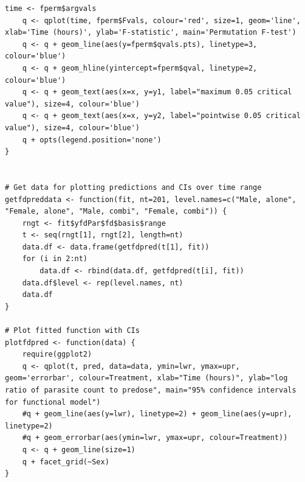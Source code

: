 \begin{singlespace}
\begin{lstlisting}[caption=Functional data analysis plots,label=R:fdaplot]
	time <- fperm$argvals
	q <- qplot(time, fperm$Fvals, colour='red', size=1, geom='line', xlab='Time (hours)', ylab='F-statistic', main='Permutation F-test')
	q <- q + geom_line(aes(y=fperm$qvals.pts), linetype=3, colour='blue')
	q <- q + geom_hline(yintercept=fperm$qval, linetype=2, colour='blue')
	q <- q + geom_text(aes(x=x, y=y1, label="maximum 0.05 critical value"), size=4, colour='blue')
	q <- q + geom_text(aes(x=x, y=y2, label="pointwise 0.05 critical value"), size=4, colour='blue')
	q + opts(legend.position='none')
}


# Get data for plotting predictions and CIs over time range
getfdpreddata <- function(fit, nt=201, level.names=c("Male, alone", "Female, alone", "Male, combi", "Female, combi")) {
	rngt <- fit$yfdPar$fd$basis$range
	t <- seq(rngt[1], rngt[2], length=nt)
	data.df <- data.frame(getfdpred(t[1], fit))
	for (i in 2:nt)
		data.df <- rbind(data.df, getfdpred(t[i], fit))
	data.df$level <- rep(level.names, nt)
	data.df
}

# Plot fitted function with CIs
plotfdpred <- function(data) {
	require(ggplot2)
	q <- qplot(t, pred, data=data, ymin=lwr, ymax=upr, geom='errorbar', colour=Treatment, xlab="Time (hours)", ylab="log ratio of parasite count to predose", main="95% confidence intervals for functional model")
	#q + geom_line(aes(y=lwr), linetype=2) + geom_line(aes(y=upr), linetype=2)
	#q + geom_errorbar(aes(ymin=lwr, ymax=upr, colour=Treatment))
	q <- q + geom_line(size=1)
	q + facet_grid(~Sex)
}
\end{lstlisting}

\end{singlespace}